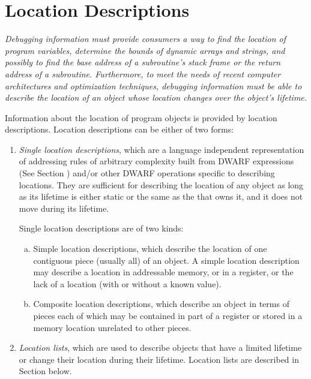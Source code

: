 \section{Location Descriptions}
\label{chap:locationdescriptions}
\textit{Debugging information 
must 
provide consumers a way to find
the location of program variables, determine the bounds
of dynamic arrays and strings, and possibly to find the
base address of a subroutine\textquoteright s stack frame or the return
address of a subroutine. Furthermore, to meet the needs of
recent computer architectures and optimization techniques,
debugging information must be able to describe the location of
an object whose location changes over the object\textquoteright s lifetime.}

Information about the location of program objects is provided
by location descriptions. Location descriptions can be either
of two forms:
\begin{enumerate}[1. ]
\item \textit{Single location descriptions}, 
which 
are 
a language independent representation of
addressing rules of arbitrary complexity built from 
DWARF expressions (See Section ) 
and/or other
DWARF operations specific to describing locations. They are
sufficient for describing the location of any object as long
as its lifetime is either static or the same as the 
 that owns it, 
and it does not move during its lifetime.

Single location descriptions are of two kinds:
\begin{enumerate}[a) ]
\item Simple location descriptions, which describe the location
of one contiguous piece (usually all) of an object. A simple
location description may describe a location in addressable
memory, or in a register, or the lack of a location (with or
without a known value).

\item  Composite location descriptions, which describe an
object in terms of pieces each of which may be contained in
part of a register or stored in a memory location unrelated
to other pieces.

\end{enumerate}
\item \textit{Location lists}, which are used to 
describe
objects that have a limited lifetime or change their location
during their lifetime. Location lists are described in
Section  below.

\end{enumerate}

